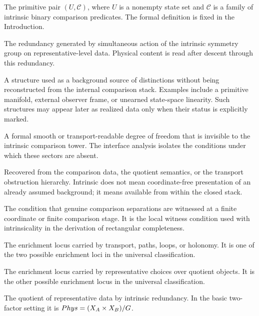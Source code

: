 \begin{description}[leftmargin=3.6cm,style=nextline]
\item[Comparison world]
The primitive pair \((U,\mathcal C)\), where \(U\) is a nonempty state set
and \(\mathcal C\) is a family of intrinsic binary comparison predicates.
The formal definition is fixed in the Introduction.

\item[Diagonal redundancy]
The redundancy generated by simultaneous action of the intrinsic symmetry
group on representative-level data.  Physical content is read after
descent through this redundancy.

\item[External primitive]
A structure used as a background source of distinctions without being
reconstructed from the internal comparison stack.  Examples include a
primitive manifold, external observer frame, or unearned state-space
linearity.  Such structures may appear later as realized data only when
their status is explicitly marked.

\item[Ghost sector]
A formal smooth or transport-readable degree of freedom that is invisible
to the intrinsic comparison tower.  The interface analysis isolates the
conditions under which these sectors are absent.

\item[Intrinsic]
Recovered from the comparison data, the quotient semantics, or the
transport obstruction hierarchy.  Intrinsic does not mean
coordinate-free presentation of an already assumed background; it means
available from within the closed stack.

\item[Local distinguishability]
The condition that genuine comparison separations are witnessed at a
finite coordinate or finite comparison stage.  It is the local witness
condition used with intrinsicality in the derivation of rectangular
completeness.

\item[Morphism locus]
The enrichment locus carried by transport, paths, loops, or holonomy.
It is one of the two possible enrichment loci in the universal
classification.

\item[Object locus]
The enrichment locus carried by representative choices over quotient
objects.  It is the other possible enrichment locus in the universal
classification.

\item[Physical quotient]
The quotient of representative data by intrinsic redundancy.  In the
basic two-factor setting it is \(Phys=(X_A\times X_B)/G\).


\end{description}
